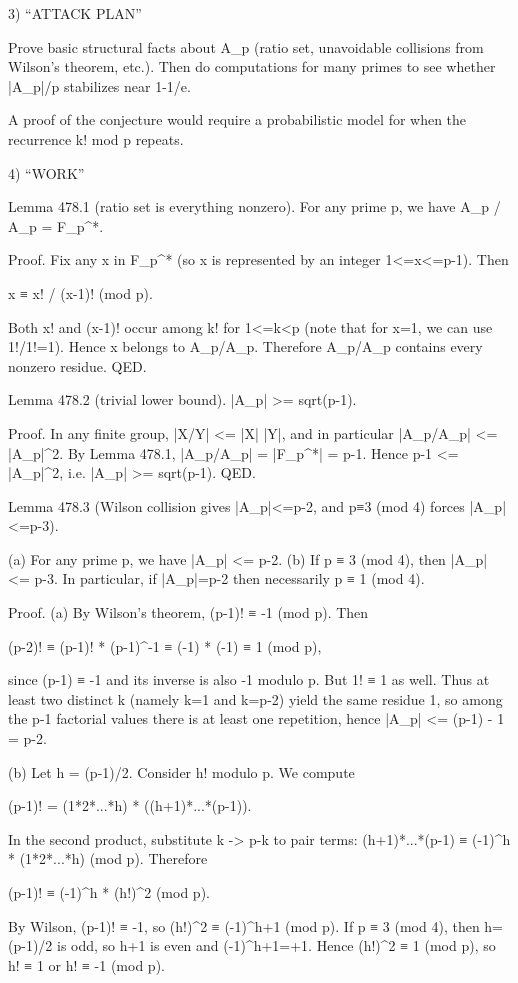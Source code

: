 3) “ATTACK PLAN”

Prove basic structural facts about A_p (ratio set, unavoidable collisions from Wilson's theorem, etc.). Then do computations for many primes to see whether |A_p|/p stabilizes near 1-1/e.

A proof of the conjecture would require a probabilistic model for when the recurrence k! mod p repeats.

4) “WORK”

Lemma 478.1 (ratio set is everything nonzero).
For any prime p, we have A_p / A_p = F_p^*.

Proof.
Fix any x in F_p^* (so x is represented by an integer 1<=x<=p-1). Then

    x ≡ x! / (x-1)!  (mod p).

Both x! and (x-1)! occur among k! for 1<=k<p (note that for x=1, we can use 1!/1!=1). Hence x belongs to A_p/A_p. Therefore A_p/A_p contains every nonzero residue.  QED.

Lemma 478.2 (trivial lower bound).
|A_p| >= sqrt(p-1).

Proof.
In any finite group, |X/Y| <= |X| |Y|, and in particular |A_p/A_p| <= |A_p|^2. By Lemma 478.1, |A_p/A_p| = |F_p^*| = p-1. Hence p-1 <= |A_p|^2, i.e. |A_p| >= sqrt(p-1).  QED.

Lemma 478.3 (Wilson collision gives |A_p|<=p-2, and p≡3 (mod 4) forces |A_p|<=p-3).

(a) For any prime p, we have |A_p| <= p-2.
(b) If p ≡ 3 (mod 4), then |A_p| <= p-3. In particular, if |A_p|=p-2 then necessarily p ≡ 1 (mod 4).

Proof.
(a) By Wilson's theorem, (p-1)! ≡ -1 (mod p). Then

    (p-2)! ≡ (p-1)! * (p-1)^{-1} ≡ (-1) * (-1) ≡ 1 (mod p),

since (p-1) ≡ -1 and its inverse is also -1 modulo p. But 1! ≡ 1 as well. Thus at least two distinct k (namely k=1 and k=p-2) yield the same residue 1, so among the p-1 factorial values there is at least one repetition, hence |A_p| <= (p-1) - 1 = p-2.

(b) Let h = (p-1)/2. Consider h! modulo p. We compute

    (p-1)! = (1*2*...*h) * ((h+1)*...*(p-1)).

In the second product, substitute k -> p-k to pair terms: (h+1)*...*(p-1) ≡ (-1)^h * (1*2*...*h) (mod p). Therefore

    (p-1)! ≡ (-1)^h * (h!)^2  (mod p).

By Wilson, (p-1)! ≡ -1, so (h!)^2 ≡ (-1)^{h+1} (mod p).
If p ≡ 3 (mod 4), then h=(p-1)/2 is odd, so h+1 is even and (-1)^{h+1}=+1. Hence (h!)^2 ≡ 1 (mod p), so h! ≡ 1 or h! ≡ -1 (mod p).

